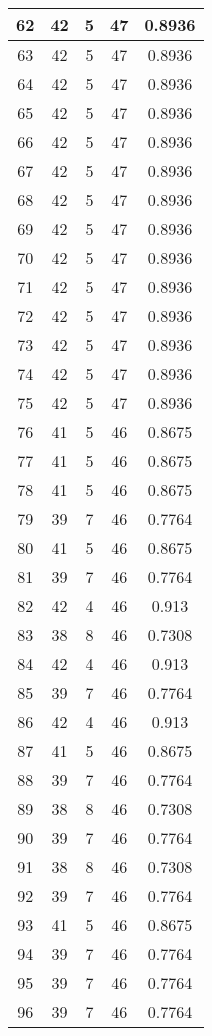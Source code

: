 \documentclass[letterpaper, 12pt]{article}
\begin{document}
\begin{longtable}{|c|c|c|c|c|}
\hline
62 & 42 & 5 & 47 & 0.8936 \\
\hline
63 & 42 & 5 & 47 & 0.8936 \\
\hline
64 & 42 & 5 & 47 & 0.8936 \\
\hline
65 & 42 & 5 & 47 & 0.8936 \\
\hline
66 & 42 & 5 & 47 & 0.8936 \\
\hline
67 & 42 & 5 & 47 & 0.8936 \\
\hline
68 & 42 & 5 & 47 & 0.8936 \\
\hline
69 & 42 & 5 & 47 & 0.8936 \\
\hline
70 & 42 & 5 & 47 & 0.8936 \\
\hline
71 & 42 & 5 & 47 & 0.8936 \\
\hline
72 & 42 & 5 & 47 & 0.8936 \\
\hline
73 & 42 & 5 & 47 & 0.8936 \\
\hline
74 & 42 & 5 & 47 & 0.8936 \\
\hline
75 & 42 & 5 & 47 & 0.8936 \\
\hline
76 & 41 & 5 & 46 & 0.8675 \\
\hline
77 & 41 & 5 & 46 & 0.8675 \\
\hline
78 & 41 & 5 & 46 & 0.8675 \\
\hline
79 & 39 & 7 & 46 & 0.7764 \\
\hline
80 & 41 & 5 & 46 & 0.8675 \\
\hline
81 & 39 & 7 & 46 & 0.7764 \\
\hline
82 & 42 & 4 & 46 & 0.913 \\
\hline
83 & 38 & 8 & 46 & 0.7308 \\
\hline
84 & 42 & 4 & 46 & 0.913 \\
\hline
85 & 39 & 7 & 46 & 0.7764 \\
\hline
86 & 42 & 4 & 46 & 0.913 \\
\hline
87 & 41 & 5 & 46 & 0.8675 \\
\hline
88 & 39 & 7 & 46 & 0.7764 \\
\hline
89 & 38 & 8 & 46 & 0.7308 \\
\hline
90 & 39 & 7 & 46 & 0.7764 \\
\hline
91 & 38 & 8 & 46 & 0.7308 \\
\hline
92 & 39 & 7 & 46 & 0.7764 \\
\hline
93 & 41 & 5 & 46 & 0.8675 \\
\hline
94 & 39 & 7 & 46 & 0.7764 \\
\hline
95 & 39 & 7 & 46 & 0.7764 \\
\hline
96 & 39 & 7 & 46 & 0.7764 \\

\end{longtable}
\end{document}
